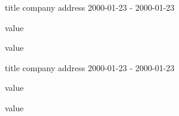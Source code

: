 
\begin{cventries}


\cventry
{title}
{company}
{address}
{2000-01-23 - 2000-01-23}
{
\begin{cvitems}
    
\item {value}
\item {value}
\end{cvitems}
}
\cventry
{title}
{company}
{address}
{2000-01-23 - 2000-01-23}
{
\begin{cvitems}
    
\item {value}
\item {value}
\end{cvitems}
}
\end{cventries}
